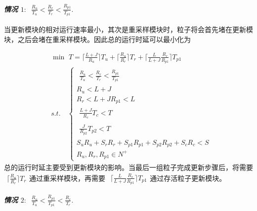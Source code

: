 \emph{\textbf{情况 $1$}}: $\begin{aligned}\frac{R_u}{T_u}<\frac{R_r}{T_r}<\frac{R_{p1}}{T_{p1}}.\end{aligned}$

当更新模块的相对运行速率最小，其次是重采样模块时，粒子将会首先堵在更新模块，之后会堵在重采样模块。因此总的运行时延可以最小化为

\begin{equation}\label{Eq:08}
\begin{split}
&\min \,\, T=\lceil\frac{L+J}{R_{u}}\rceil T_{u}+\lceil\frac{R_{u}}{R_{r}}\rceil T_{r}+\lceil\frac{L}{L+J}\frac{R_r}{R_{p1}}\rceil T_{p1}\\
&s.t.\quad  \left\{\begin{array}{l}
\begin{aligned}\frac{R_u}{T_u}<\frac{R_r}{T_r}<\frac{R_{p1}}{T_{p1}}\end{aligned} \\
R_{u}<L+J\\
R_{r}<L+J
R_{p1}<L \\
\begin{split} \frac{L+J}{R_c}T_c<T    \end{split} \\
\begin{split}\frac{J}{R_{p2}}T_{p2}<T\end{split}\\
S_uR_{u}+S_rR_{r}+S_{p1}R_{p1}+S_{p2}R_{p2}+S_cR_{c}<S\\
R_{u},R_{r},R_{p1}\in N^+ \end{array}\right.
\end{split}
\end{equation}
总的运行时延主要受到更新模块的影响。当最后一组粒子完成更新步骤后，将需要 $\begin{aligned}\lceil\frac{R_{u}}{R_{r}}\rceil T_{r}\end{aligned}$通过重采样模块，再需要 $\begin{aligned}\lceil\frac{L}{L+J}\frac{R_r}{R_{p1}}\rceil T_{p1}\end{aligned}$通过存活粒子更新模块。

\emph{\textbf{情况 $2$}}: $\begin{aligned}\frac{R_u}{T_u}<\frac{R_{p1}}{T_{p1}}<\frac{R_{r}}{T_{r}}.\end{aligned}$

